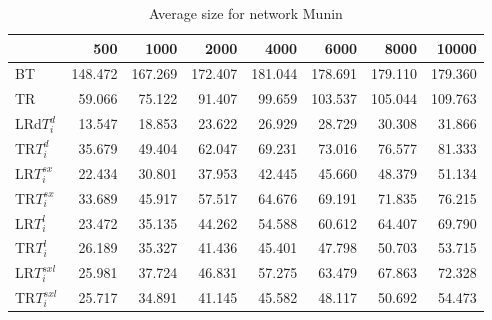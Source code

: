 \begin{table}
\begin{center}
\begin{tabular}{lrrrrrrr}
 & 500 &  1000 & 2000 & 4000 & 6000& 8000&  10000\\\hline
BT & 148.472 & 167.269 & 172.407 & 181.044 & 178.691 & 179.110 & 179.360\\\hline
TR & 59.066 & 75.122 & 91.407 & 99.659 & 103.537 & 105.044 & 109.763\\\hline
LRd$T_i^d$ & 13.547 & 18.853 & 23.622 & 26.929 & 28.729 & 30.308 & 31.866\\\hline
TR$T_i^d$ & 35.679 & 49.404 & 62.047 & 69.231 & 73.016 & 76.577 & 81.333\\\hline
LR$T_i^{sx}$ & 22.434 & 30.801 & 37.953 & 42.445 & 45.660 & 48.379 & 51.134\\\hline
TR$T_i^{sx}$ & 33.689 & 45.917 & 57.517 & 64.676 & 69.191 & 71.835 & 76.215\\\hline
LR$T_i^l$ & 23.472 & 35.135 & 44.262 & 54.588 & 60.612 & 64.407 & 69.790\\\hline
TR$T_i^l$ & 26.189 & 35.327 & 41.436 & 45.401 & 47.798 & 50.703 & 53.715\\\hline
LR$T_i^{sxl}$ & 25.981 & 37.724 & 46.831 & 57.275 & 63.479 & 67.863 & 72.328\\\hline
TR$T_i^{sxl}$ & 25.717 & 34.891 & 41.145 & 45.582 & 48.117 & 50.692 & 54.473\\\hline
\end{tabular}
\end{center}
\caption{Average size for network Munin }
\label{Muninsi}
\end{table}

